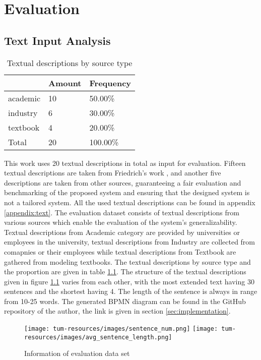 \chapter{Evaluation}
\label{sec:evaluation}

\section{Text Input Analysis}
\begin{table}[]
\begin{center}
\caption{\centering Textual descriptions by source type}
\label{table:source_type}
\begin{tabular}{l|l|l}
         & Amount & Frequency \\ \hline
academic & 10     & 50.00\%   \\
industry & 6      & 30.00\%   \\
textbook & 4      & 20.00\%   \\ \hline
Total    & 20     & 100.00\% 
\end{tabular}
\end{center}
\end{table}

This work uses 20 textual descriptions in total as input for evaluation. Fifteen textual descriptions are taken from Friedrich's work \cite{t2m_1_main}, and another five descriptions are taken from other sources, guaranteeing a fair evaluation and benchmarking of the proposed system and ensuring that the designed system is not a tailored system. All the used textual descriptions can be found in appendix \ref{appendix:text}. The evaluation dataset consists of textual descriptions from various sources which enable the evaluation of the system's generalizability. Textual descriptions from Academic category are provided by universities or employees in the university, textual descriptions from Industry are collected from comapnies or their employees while textual descriptions from Textbook are gathered from modeling textbooks. The textual descriptions by source type and the proportion are given in table \ref{table:source_type}. The structure of the textual descriptions given in figure \ref{img:eva_info} varies from each other, with the most extended text having 30 sentences and the shortest having 4. The length of the sentence is always in range from 10-25 words. The generated BPMN diagram can be found in the GitHub repository of the author, the link is given in section \ref{sec:implementation}.

\begin{figure}[h]
    \centering
    \caption{Information of evaluation data set}
    \label{img:eva_info}
    \texttt{[image: tum-resources/images/sentence\_num.png]}
    \hspace{1in}
     \texttt{[image: tum-resources/images/avg\_sentence\_length.png]}
\end{figure} 

